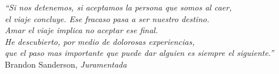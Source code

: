 % 
% 
% 
% 
% 
% 
% 
% 

% 
% 

\thispagestyle{empty}

\begin{flushright}

  \vspace*{\fill}

  \vspace{3cm}

  \emph{``Si nos detenemos, si aceptamos la persona que somos al caer, \\el viaje concluye.
  Ese fracaso pasa a ser nuestro destino.\\
  Amar el viaje implica no aceptar ese final.\\He descubierto,
  por medio de dolorosas experiencias,\\
  que el paso mas importante que puede dar alguien es siempre el siguiente.''}\\ Brandon Sanderson, \emph{Juramentada}

\end{flushright}

\vspace{4cm}
\vspace*{\fill}




